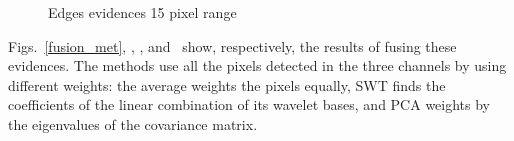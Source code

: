 \documentclass[conference]{IEEEtran}
\begin{document}
\begin{figure}[hbt]
	\centering
     \caption{Edges evidences 15 pixel range}
     \label{evidencias_hh_hv_vv 15 pixel range} 
   \end{figure}   
   
Figs.~\ref{fusion_met}, , , and~ show, respectively, the results of fusing these evidences. The methods use all the pixels detected in the three channels by using different weights: 
the average weights the pixels equally, SWT finds the coefficients of the linear combination of its wavelet bases, and PCA weights by the eigenvalues of the covariance matrix.
\end{document}

